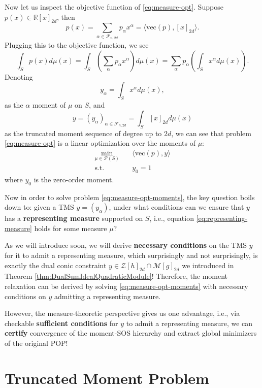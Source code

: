 \documentclass[
]{book}
\theoremstyle{definition}
\theoremstyle{definition}
\theoremstyle{definition}
\theoremstyle{definition}
\theoremstyle{remark}
\begin{document}
Now let us inspect the objective function of \eqref{eq:measure-opt}. Suppose \(p(x) \in \mathbb{R}[x]_{2d}\), then
\[
p(x) = \sum_{\alpha \in \mathcal{F}_{n,2d}} p_{\alpha} x^{\alpha} = \langle \mathrm{vec}(p), [x]_{2d} \rangle.
\]
Plugging this to the objective function, we see
\[
\int_S p(x) d \mu(x) = \int_S \left(\sum_{\alpha} p_{\alpha} x^{\alpha}\right) d \mu(x) = \sum_{\alpha} p_{\alpha} \left(\int_S x^{\alpha} d \mu(x)\right).
\]
Denoting
\[
y_{\alpha} = \int_S x^{\alpha} d \mu(x), 
\]
as the \(\alpha\) moment of \(\mu\) on \(S\), and
\begin{equation}
y = (y_\alpha)_{\alpha \in \mathcal{F}_{n,2d}} = \int_S [x]_{2d} d \mu(x)
\label{eq:representing-measure}
\end{equation}
as the truncated moment sequence of degree up to \(2d\), we can see that problem \eqref{eq:measure-opt} is a linear optimization over the moments of \(\mu\):
\begin{equation}
\begin{split}
\min_{\mu \in \mathcal{P}(S)} & \quad \langle \mathrm{vec}(p), y \rangle \\
\mathrm{s.t.}& \quad y_0 = 1
\end{split}
\label{eq:measure-opt-moments}
\end{equation}
where \(y_0\) is the zero-order moment.

Now in order to solve problem \eqref{eq:measure-opt-moments}, the key question boils down to: given a TMS \(y = (y_{\alpha})\), under what conditions can we ensure that \(y\) has a \textbf{representing measure} supported on \(S\), i.e., equation \eqref{eq:representing-measure} holds for some measure \(\mu\)?

As we will introduce soon, we will derive \textbf{necessary conditions} on the TMS \(y\) for it to admit a representing measure, which surprisingly and not surprisingly, is exactly the dual conic constraint \(y \in \mathcal{Z}[h]_{2d} \cap \mathcal{M}[g]_{2d}\) we introduced in Theorem \ref{thm:DualSumIdealQuadraticModule}! Therefore, the moment relaxation can be derived by solving \eqref{eq:measure-opt-moments} with necessary conditions on \(y\) admitting a representing measure.

However, the measure-theoretic perspective gives us one advantage, i.e., via checkable \textbf{sufficient conditions} for \(y\) to admit a representing measure, we can \textbf{certify} convergence of the moment-SOS hierarchy and extract global minimizers of the original POP!

\section{Truncated Moment Problem}\label{truncated-moment-problem}

  
\end{document}
